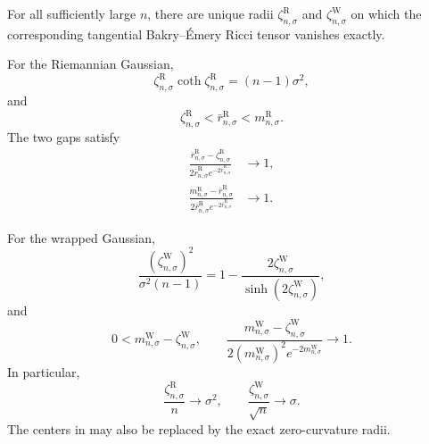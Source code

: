 \documentclass[10pt,a4paper]{amsart}
\begin{document}
\begin{thm}
\label{thm:gaussian-zero-shells}
	For all sufficiently large $n$, there are unique radii
	$\zeta^{\mathrm R}_{n,\sigma}$ and
	$\zeta^{\mathrm W}_{n,\sigma}$ on which the corresponding tangential
	Bakry--\'Emery Ricci tensor vanishes exactly.

	For the Riemannian Gaussian,
	\begin{equation}\label{eq:R-zero-equation}
		\zeta^{\mathrm R}_{n,\sigma}
		\coth\zeta^{\mathrm R}_{n,\sigma}
		=
		(n-1)\sigma^2,
	\end{equation}
	and
	\begin{equation}\label{eq:R-zero-sandwich}
		\zeta^{\mathrm R}_{n,\sigma}
		<
		\bar r^{\mathrm R}_{n,\sigma}
		<
		m^{\mathrm R}_{n,\sigma}.
	\end{equation}
	The two gaps satisfy
	\begin{align}
		\frac{\bar r^{\mathrm R}_{n,\sigma}
		-\zeta^{\mathrm R}_{n,\sigma}}
		{2\bar r^{\mathrm R}_{n,\sigma}
		e^{-2\bar r^{\mathrm R}_{n,\sigma}}}
		&\longrightarrow1,
		\label{eq:R-zero-gap}\\
		\frac{m^{\mathrm R}_{n,\sigma}
		-\bar r^{\mathrm R}_{n,\sigma}}
		{2\bar r^{\mathrm R}_{n,\sigma}
		e^{-2\bar r^{\mathrm R}_{n,\sigma}}}
		&\longrightarrow1.
		\label{eq:R-mode-gap}
	\end{align}

	For the wrapped Gaussian,
	\begin{equation}\label{eq:W-zero-equation}
		\frac{(\zeta^{\mathrm W}_{n,\sigma})^2}
		{\sigma^2(n-1)}
		=
		1-\frac{2\zeta^{\mathrm W}_{n,\sigma}}
		{\sinh(2\zeta^{\mathrm W}_{n,\sigma})},
	\end{equation}
	and
	\begin{equation}\label{eq:W-zero-gap}
		0<m^{\mathrm W}_{n,\sigma}-\zeta^{\mathrm W}_{n,\sigma},
		\qquad
		\frac{m^{\mathrm W}_{n,\sigma}
		-\zeta^{\mathrm W}_{n,\sigma}}
		{2(m^{\mathrm W}_{n,\sigma})^2
		e^{-2m^{\mathrm W}_{n,\sigma}}}
		\longrightarrow1.
	\end{equation}
	In particular,
	\begin{equation}\label{eq:zero-scales}
		\frac{\zeta^{\mathrm R}_{n,\sigma}}n\longrightarrow\sigma^2,
		\qquad
		\frac{\zeta^{\mathrm W}_{n,\sigma}}{\sqrt n}\longrightarrow\sigma.
	\end{equation}
	The centers in  may also be replaced by
	the exact zero-curvature radii.
\end{thm}
\end{document}
